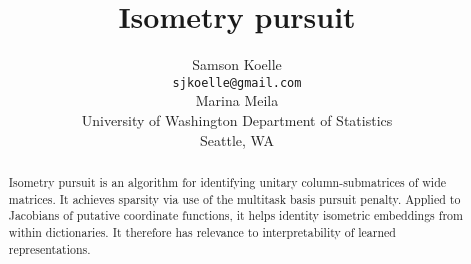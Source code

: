 \documentclass{article}
\title{Isometry pursuit}
\author{%
  Samson Koelle \\
  \texttt{sjkoelle@gmail.com} \\
  \And
  Marina Meila \\
  University of Washington Department of Statistics\\
  Seattle, WA \\
}
\begin{document}
\maketitle

\begin{abstract}
Isometry pursuit is an algorithm for identifying unitary column-submatrices of wide matrices.
It achieves sparsity via use of the multitask basis pursuit penalty.
Applied to Jacobians of putative coordinate functions, it helps identity isometric embeddings from within dictionaries.
It therefore has relevance to interpretability of learned representations.
\end{abstract}










\end{document}
